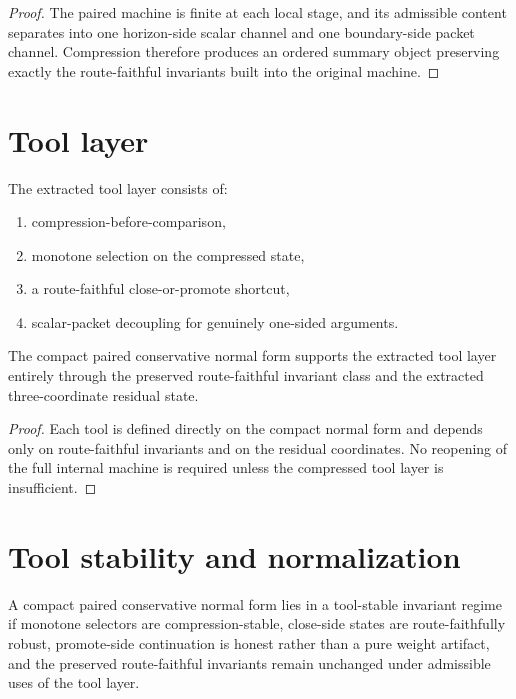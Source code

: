 \begin{proof}
The paired machine is finite at each local stage, and its admissible content separates into one horizon-side scalar channel and one boundary-side packet channel. Compression therefore produces an ordered summary object preserving exactly the route-faithful invariants built into the original machine.
\end{proof}

\section{Tool layer}
\begin{definition}\label{def:tool-layer}
The extracted tool layer consists of:
\begin{enumerate}[leftmargin=2em]
  \item compression-before-comparison,
  \item monotone selection on the compressed state,
  \item a route-faithful close-or-promote shortcut,
  \item scalar-packet decoupling for genuinely one-sided arguments.
\end{enumerate}
\end{definition}

\begin{theorem}\label{thm:tool-extraction}
The compact paired conservative normal form supports the extracted tool layer entirely through the preserved route-faithful invariant class and the extracted three-coordinate residual state.
\end{theorem}

\begin{proof}
Each tool is defined directly on the compact normal form and depends only on route-faithful invariants and on the residual coordinates. No reopening of the full internal machine is required unless the compressed tool layer is insufficient.
\end{proof}

\section{Tool stability and normalization}
\begin{definition}\label{def:tool-stable-invariant-regime}
A compact paired conservative normal form lies in a tool-stable invariant regime if monotone selectors are compression-stable, close-side states are route-faithfully robust, promote-side continuation is honest rather than a pure weight artifact, and the preserved route-faithful invariants remain unchanged under admissible uses of the tool layer.
\end{definition}


